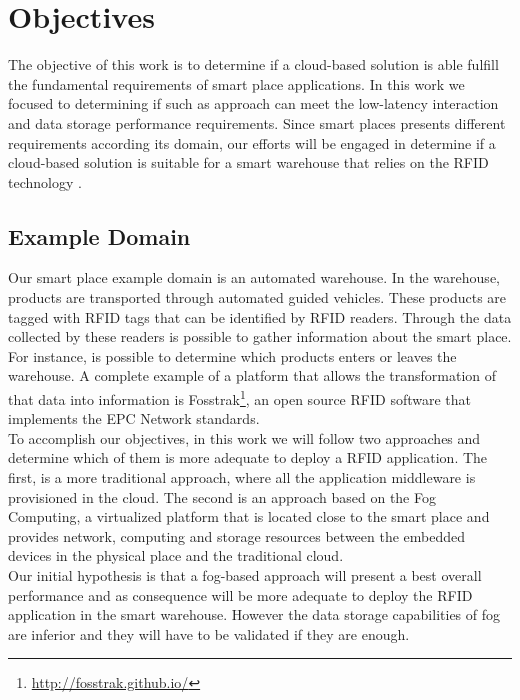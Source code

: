 \section{Objectives}
\label{section:objectives}
The objective of this work is to determine if a cloud-based solution is able fulfill the fundamental
requirements of smart place applications. In this work we focused to determining if such as approach
can meet the low-latency interaction and data storage performance requirements. Since smart places
presents different requirements according its domain, our efforts will be engaged in determine if a
cloud-based solution is suitable for a smart warehouse that relies on the RFID technology \cite{want2006introduction}.\\

\subsection{Example Domain}
\label{sub:domain}
Our smart place example domain is an automated warehouse. In the warehouse, products are transported
through automated guided vehicles. These products are tagged with \gls{RFID} tags that can be identified
by \gls{RFID} readers.  Through the data collected by these readers is possible to gather information
about the smart place. For instance, is possible to determine which products enters or leaves the
warehouse. A complete example of a platform that allows the transformation of that data into
information is Fosstrak\footnote{\url{http://fosstrak.github.io/}}, an open source \gls{RFID}
software that implements the \gls{EPC} Network standards.\\

To accomplish our objectives, in this work we will follow two approaches and determine which of them
is more adequate to deploy a \gls{RFID} application. The first, is a more traditional approach, where
all the application middleware is provisioned in the cloud. The second is an approach based on the Fog
Computing\cite{bonomi2012fog}, a virtualized platform that is located close to the smart place and
provides network, computing and storage resources between the embedded devices in the physical place
and the traditional cloud.\\

Our initial hypothesis is that a fog-based approach will present a best overall performance and as
consequence will be more adequate to deploy the \gls{RFID} application in the smart warehouse. However
the data storage capabilities of fog are inferior and  they will have to be validated if they are enough.

